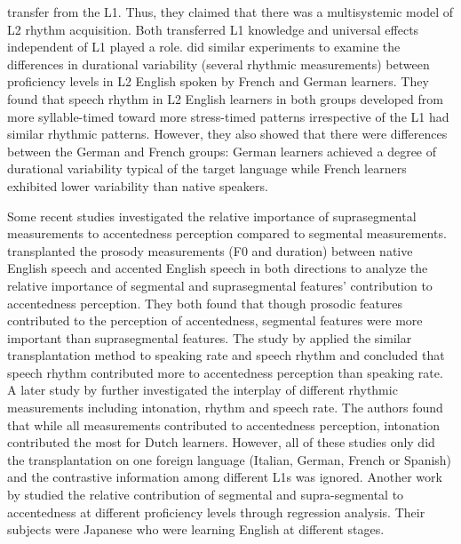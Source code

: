 transfer from the L1. Thus, they claimed that there was a multisystemic model of L2 rhythm acquisition. Both transferred L1 knowledge and universal effects independent of L1 played a role. \cite{ordin2015acquisition} did similar experiments to examine the differences in durational variability (several rhythmic measurements) between proficiency levels in L2 English spoken by French and German learners. They found that speech rhythm in L2 English learners in both groups developed from more syllable-timed toward more stress-timed patterns irrespective of the L1 had similar rhythmic patterns. However, they also showed that there were differences between the German and French groups: German learners achieved a degree of durational variability typical of the target language while French learners exhibited lower variability than native speakers.

Some recent studies investigated the relative importance of suprasegmental measurements to accentedness perception compared to segmental measurements. \cite{rognoni2013testing, winters2013perceived} transplanted the prosody measurements (F0 and duration) between native English speech and accented English speech in both directions to analyze the relative importance of segmental and suprasegmental features' contribution to accentedness perception. They both found that though prosodic features contributed to the perception of accentedness, segmental features were more important than suprasegmental features. The study by \cite{polyanskaya2016relative} applied the similar transplantation method to speaking rate and speech rhythm and concluded that speech rhythm contributed more to accentedness perception than speaking rate. A later study by \cite{van2017l1} further investigated the interplay of different rhythmic measurements including intonation, rhythm and speech rate. The authors found that while all measurements contributed to accentedness perception, intonation contributed the most for Dutch learners. However, all of these studies only did the transplantation on one foreign language (Italian, German, French or Spanish) and the contrastive information among different L1s was ignored. Another work by \cite{saito2016second} studied the relative contribution of segmental and supra-segmental to accentedness at different proficiency levels through regression analysis. Their subjects were Japanese who were learning English at different stages.

